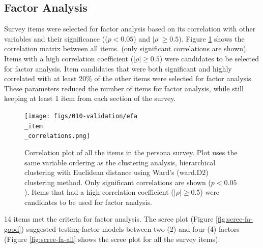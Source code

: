 \documentclass[020-persona\_validation.tex]{subfiles}
\begin{document}
    \subsection{Factor Analysis}

        Survey items were selected for factor analysis based on its correlation with other variables and their significance
        (($p < 0.05$) and $\left|\rho\right| \ge 0.5$).
        Figure \ref{fig:persona-item-corr} shows the correlation matrix between all items.
        (only significant correlations are shown).
        Items with a high correlation coefficient ($\left|\rho\right| \ge 0.5$) were candidates to be selected for factor analysis.
        Item candidates that were both significant and highly correlated with at least 20\% of the other items were
        selected for factor analysis.
        These parameters reduced the number of items for factor analysis,
        while still keeping at least 1 item from each section of the survey.

        \begin{figure}[htb]
            \centering
            \texttt{[image: figs/010-validation/efa\\\_item\\\_correlations.png]}
            \caption[Correlation matrix of persona items]
            {Correlation plot of all the items in the persona survey.
             Plot uses the same variable ordering as the clustering analysis,
             hierarchical clustering with Euclidean distance using Ward's (ward.D2) clustering method.
             Only significant correlations are shown ($p < 0.05$).
             Items that had a high correlation coefficient ($\left|\rho\right| \ge 0.5$)
             were candidates to be used for factor analysis.
            }
            \label{fig:persona-item-corr}
        \end{figure}

        14 items met the criteria for factor analysis.
        The scree plot (Figure \ref{fig:scree-fa-good}) suggested testing factor models between two (2) and four (4) factors
        (Figure \ref{fig:scree-fa-all} shows the scree plot for all the survey items).
\end{document}
